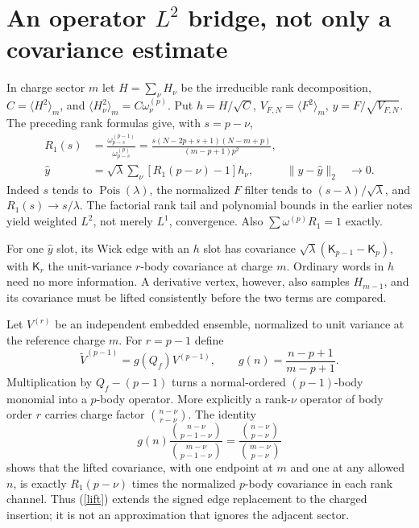 \documentclass[11pt,a4paper]{article}
\newcommand{\av}[1]{\langle #1\rangle}
\begin{document}
\newpage
\section{An operator $L^2$ bridge, not only a covariance estimate}
In charge sector $m$ let $H=\sum_\nu H_\nu$ be the irreducible
rank decomposition, $C=\av{H^2}_m$, and
$\av{H_\nu^2}_m=C\omega_\nu^{(p)}$. Put $h=H/\sqrt C$,
$V_{F,N}=\av{F^2}_m$, $y=F/\sqrt{V_{F,N}}$. The preceding
rank formulas give, with $s=p-\nu$,
\begin{align}
 R_1(s)&=\frac{\omega_{p-s}^{(p-1)}}{\omega_{p-s}^{(p)}}
 =\frac{s(N-2p+s+1)(N-m+p)}{(m-p+1)p^2},\label{ratio}\\
 \widehat y&=\sqrt\lambda\sum_\nu[R_1(p-\nu)-1]h_\nu,
 &\|y-\widehat y\|_2&\longrightarrow0.\label{l2}
\end{align}
Indeed $s$ tends to $\operatorname{Pois}(\lambda)$, the normalized
$F$ filter tends to $(s-\lambda)/\sqrt\lambda$, and
$R_1(s)\to s/\lambda$. The factorial rank tail and polynomial
bounds in the earlier notes yield weighted $L^2$, not merely $L^1$,
convergence. Also $\sum\omega^{(p)}R_1=1$ exactly.

For one $\widehat y$ slot, its Wick edge with an $h$ slot has
covariance $\sqrt\lambda(\mathsf K_{p-1}-\mathsf K_p)$, with
$\mathsf K_r$ the unit-variance $r$-body covariance at charge $m$.
Ordinary words in $h$ need no more information. A derivative vertex,
however, also samples $H_{m-1}$, and its covariance must be lifted
consistently before the two terms are compared.

Let $V^{(r)}$ be an independent embedded ensemble, normalized to
unit variance at the reference charge $m$. For $r=p-1$ define
\begin{equation}
 \widetilde V^{(p-1)}=g(Q_f)V^{(p-1)},\qquad
 g(n)=\frac{n-p+1}{m-p+1}.\label{lift}
\end{equation}
Multiplication by $Q_f-(p-1)$ turns a normal-ordered $(p-1)$-body
monomial into a $p$-body operator. More explicitly a rank-$\nu$
operator of body order $r$ carries charge factor
$\binom{n-\nu}{r-\nu}$. The identity
\begin{equation}
 g(n)\frac{\binom{n-\nu}{p-1-\nu}}{\binom{m-\nu}{p-1-\nu}}
 =\frac{\binom{n-\nu}{p-\nu}}{\binom{m-\nu}{p-\nu}}\label{charge}
\end{equation}
shows that the lifted covariance, with one endpoint at $m$ and one
at any allowed $n$, is exactly $R_1(p-\nu)$ times the normalized
$p$-body covariance in each rank channel. Thus (\ref{lift})
extends the signed edge replacement to the charged insertion;
it is not an approximation that ignores the adjacent sector.
\end{document}

